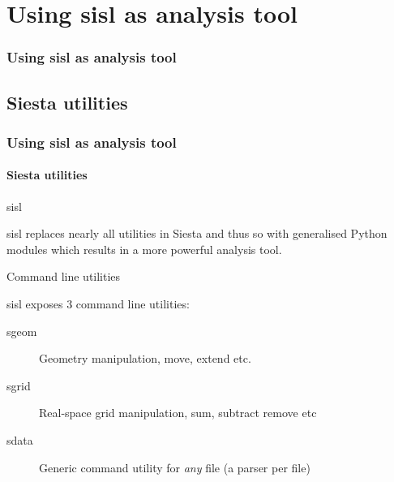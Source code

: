 
\section{Using sisl as analysis tool}

\begin{frame}
  \frametitle{Using sisl as analysis tool}
  \tableofcontents[currentsection]
\end{frame}

\subsection{Siesta utilities}

\begin{frame}
  \frametitle{Using sisl as analysis tool}
  \framesubtitle{Siesta utilities}

  \begin{block}{sisl}

    sisl replaces nearly all utilities in Siesta and thus so with generalised Python
    modules which results in a more powerful analysis tool.
    
  \end{block}

  \begin{block}{Command line utilities}

    sisl exposes 3 command line utilities:

    \begin{description}
      \item[sgeom] Geometry manipulation, move, extend etc.

      \item[sgrid] Real-space grid manipulation, sum, subtract remove etc

      \item[sdata] Generic command utility for \emph{any} file (a parser per file)

    \end{description}

  \end{block}
  

\end{frame}
